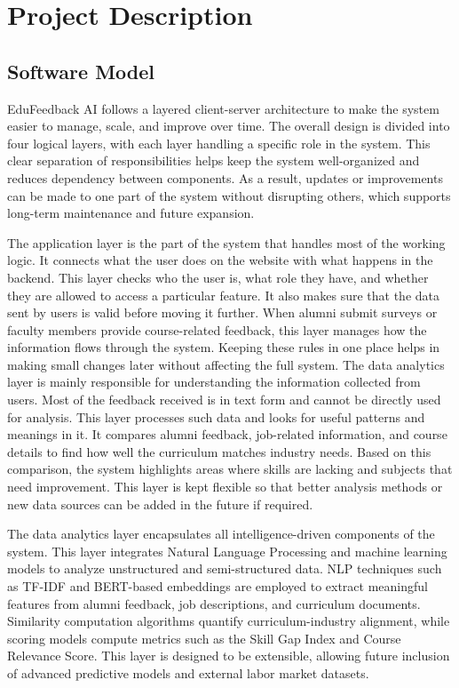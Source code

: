 \chapter{Project Description}
\label{Chapter:Description}

\section{Software Model}
EduFeedback AI follows a layered client-server architecture to make the system easier to manage, scale, and improve over time. The overall design is divided into four logical layers, with each layer handling a specific role in the system. This clear separation of responsibilities helps keep the system well-organized and reduces dependency between components. As a result, updates or improvements can be made to one part of the system without disrupting others, which supports long-term maintenance and future expansion.

The application layer is the part of the system that handles most of the working logic. It connects what the user does on the website with what happens in the backend. This layer checks who the user is, what role they have, and whether they are allowed to access a particular feature. It also makes sure that the data sent by users is valid before moving it further. When alumni submit surveys or faculty members provide course-related feedback, this layer manages how the information flows through the system. Keeping these rules in one place helps in making small changes later without affecting the full system. The data analytics layer is mainly responsible for understanding the information collected from users. Most of the feedback received is in text form and cannot be directly used for analysis. This layer processes such data and looks for useful patterns and meanings in it. It compares alumni feedback, job-related information, and course details to find how well the curriculum matches industry needs. Based on this comparison, the system highlights areas where skills are lacking and subjects that need improvement. This layer is kept flexible so that better analysis methods or new data sources can be added in the future if required.

The data analytics layer encapsulates all intelligence-driven components of the system. This layer integrates Natural Language Processing and machine learning models to analyze unstructured and semi-structured data. NLP techniques such as TF-IDF and BERT-based embeddings are employed to extract meaningful features from alumni feedback, job descriptions, and curriculum documents. Similarity computation algorithms quantify curriculum-industry alignment, while scoring models compute metrics such as the Skill Gap Index and Course Relevance Score. This layer is designed to be extensible, allowing future inclusion of advanced predictive models and external labor market datasets.


